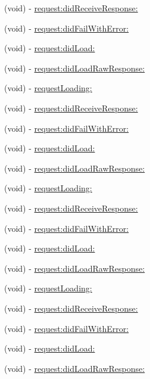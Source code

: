 \begin{DoxyCompactItemize}
(void) -\/ \hyperlink{protocol_f_b_request_delegate-p_a8cde5cc6c16a5741620eef28bcbb49de}{request\-:did\-Receive\-Response\-:}
\item 
(void) -\/ \hyperlink{protocol_f_b_request_delegate-p_a72b496882171f6660300025f5c82201b}{request\-:did\-Fail\-With\-Error\-:}
\item 
(void) -\/ \hyperlink{protocol_f_b_request_delegate-p_a26994e26be1a1414f82a5cf92d1b3865}{request\-:did\-Load\-:}
\item 
(void) -\/ \hyperlink{protocol_f_b_request_delegate-p_a4941d7fd8fda538fec9b1dcef54cb9ac}{request\-:did\-Load\-Raw\-Response\-:}
\item 
(void) -\/ \hyperlink{protocol_f_b_request_delegate-p_ad1af69a59feb2ba71fe590006a8a171e}{request\-Loading\-:}
\item 
(void) -\/ \hyperlink{protocol_f_b_request_delegate-p_a8cde5cc6c16a5741620eef28bcbb49de}{request\-:did\-Receive\-Response\-:}
\item 
(void) -\/ \hyperlink{protocol_f_b_request_delegate-p_a72b496882171f6660300025f5c82201b}{request\-:did\-Fail\-With\-Error\-:}
\item 
(void) -\/ \hyperlink{protocol_f_b_request_delegate-p_a26994e26be1a1414f82a5cf92d1b3865}{request\-:did\-Load\-:}
\item 
(void) -\/ \hyperlink{protocol_f_b_request_delegate-p_a4941d7fd8fda538fec9b1dcef54cb9ac}{request\-:did\-Load\-Raw\-Response\-:}
\item 
(void) -\/ \hyperlink{protocol_f_b_request_delegate-p_ad1af69a59feb2ba71fe590006a8a171e}{request\-Loading\-:}
\item 
(void) -\/ \hyperlink{protocol_f_b_request_delegate-p_a8cde5cc6c16a5741620eef28bcbb49de}{request\-:did\-Receive\-Response\-:}
\item 
(void) -\/ \hyperlink{protocol_f_b_request_delegate-p_a72b496882171f6660300025f5c82201b}{request\-:did\-Fail\-With\-Error\-:}
\item 
(void) -\/ \hyperlink{protocol_f_b_request_delegate-p_a26994e26be1a1414f82a5cf92d1b3865}{request\-:did\-Load\-:}
\item 
(void) -\/ \hyperlink{protocol_f_b_request_delegate-p_a4941d7fd8fda538fec9b1dcef54cb9ac}{request\-:did\-Load\-Raw\-Response\-:}
\item 
(void) -\/ \hyperlink{protocol_f_b_request_delegate-p_ad1af69a59feb2ba71fe590006a8a171e}{request\-Loading\-:}
\item 
(void) -\/ \hyperlink{protocol_f_b_request_delegate-p_a8cde5cc6c16a5741620eef28bcbb49de}{request\-:did\-Receive\-Response\-:}
\item 
(void) -\/ \hyperlink{protocol_f_b_request_delegate-p_a72b496882171f6660300025f5c82201b}{request\-:did\-Fail\-With\-Error\-:}
\item 
(void) -\/ \hyperlink{protocol_f_b_request_delegate-p_a26994e26be1a1414f82a5cf92d1b3865}{request\-:did\-Load\-:}
\item 
(void) -\/ \hyperlink{protocol_f_b_request_delegate-p_a4941d7fd8fda538fec9b1dcef54cb9ac}{request\-:did\-Load\-Raw\-Response\-:}
\end{DoxyCompactItemize}


